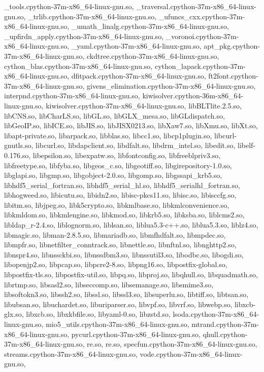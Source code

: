 \documentclass[
    12pt,                               %
    DIV=14,                     %
    parskip=half+,              %
    bigheadings,                %
    cleardoubleempty,   %
    halfparskip,                %
    ]{scrreprt} %
\begin{document}
\begin{appendices}
\begin{sloppypar}
{\_tools.cpython-37m-x86\_64-linux-gnu.so, \_traversal.cpython-37m-x86\_64-linux-gnu.so, \_trlib.cpython-37m-x86\_64-linux-gnu.so, \_ufuncs\_cxx.cpython-37m-x86\_64-linux-gnu.so, \_umath\_linalg.cpython-37m-x86\_64-linux-gnu.so, \_upfirdn\_apply.cpython-37m-x86\_64-linux-gnu.so, \_voronoi.cpython-37m-x86\_64-linux-gnu.so, \_yaml.cpython-37m-x86\_64-linux-gnu.so, apt\_pkg.cpython-37m-x86\_64-linux-gnu.so, ckdtree.cpython-37m-x86\_64-linux-gnu.so, cython\_blas.cpython-37m-x86\_64-linux-gnu.so, cython\_lapack.cpython-37m-x86\_64-linux-gnu.so, dfitpack.cpython-37m-x86\_64-linux-gnu.so, ft2font.cpython-37m-x86\_64-linux-gnu.so, givens\_elimination.cpython-37m-x86\_64-linux-gnu.so, interpnd.cpython-37m-x86\_64-linux-gnu.so, kiwisolver.cpython-36m-x86\_64-linux-gnu.so, kiwisolver.cpython-37m-x86\_64-linux-gnu.so, libBLTlite.2.5.so, libCNS.so, libCharLS.so, libGL.so, libGLX\_mesa.so, libGLdispatch.so, libGeoIP.so, libICE.so, libJIS.so, libJISX0213.so, libXaw7.so, libXmu.so, libXt.so, libapt-private.so, libarpack.so, libblas.so, libcc1.so, libcp1plugin.so, libcurl-gnutls.so, libcurl.so, libdapclient.so, libdfalt.so, libdrm\_intel.so, libedit.so, libelf-0.176.so, libepsilon.so, libexpatw.so, libfontconfig.so, libfreeblpriv3.so, libfreetype.so, libfyba.so, libgeos\_c.so, libgeotiff.so, libgirepository-1.0.so, libglapi.so, libgmp.so, libgobject-2.0.so, libgomp.so, libgssapi\_krb5.so, libhdf5\_serial\_fortran.so, libhdf5\_serial\_hl.so, libhdf5\_serialhl\_fortran.so, libhogweed.so, libicutu.so, libidn2.so, libisc-pkcs11.so, libisc.so, libisccfg.so, libitm.so, libjpeg.so, libk5crypto.so, libkmlbase.so, libkmlconvenience.so, libkmldom.so, libkmlengine.so, libkmod.so, libkrb5.so, libksba.so, liblcms2.so, libldap\_r-2.4.so, liblognorm.so, liblsan.so, liblua5.3-c++.so, liblua5.3.so, liblz4.so, libmagic.so, libman-2.8.5.so, libmariadb.so, libmfhdfalt.so, libmpdec.so, libmpfr.so, libnetfilter\_conntrack.so, libnettle.so, libnftnl.so, libnghttp2.so, libnspr4.so, libnssckbi.so, libnssdbm3.so, libnssutil3.so, libodbc.so, libogdi.so, libopenjp2.so, libpcap.so, libpcre2-8.so, libpng16.so, libpostfix-global.so, libpostfix-tls.so, libpostfix-util.so, libpq.so, libproj.so, libqhull.so, libquadmath.so, librtmp.so, libsasl2.so, libseccomp.so, libsemanage.so, libsmime3.so, libsoftokn3.so, libssh2.so, libssl.so, libssl3.so, libsuperlu.so, libtiff.so, libtsan.so, libubsan.so, libuchardet.so, liburiparser.so, libvpf.so, libvrf.so, libwebp.so, libxcb-glx.so, libxcb.so, libxkbfile.so, libyaml-0.so, libzstd.so, lsoda.cpython-37m-x86\_64-linux-gnu.so, mio5\_utils.cpython-37m-x86\_64-linux-gnu.so, mtrand.cpython-37m-x86\_64-linux-gnu.so, pycurl.cpython-37m-x86\_64-linux-gnu.so, qhull.cpython-37m-x86\_64-linux-gnu.so, re.so, re.so, specfun.cpython-37m-x86\_64-linux-gnu.so, streams.cpython-37m-x86\_64-linux-gnu.so, vode.cpython-37m-x86\_64-linux-gnu.so,
}
\end{sloppypar}

\end{appendices}
\end{document}
